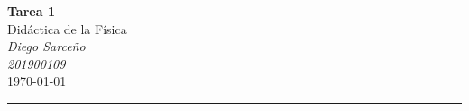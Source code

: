 




%


\textcolor{DS_Black}{
\begin{minipage}{0.85\textwidth}
    \begin{center}
        \textbf{\Large Tarea 1}\\
        \vspace{5pt}
        Didáctica de la Física \\
        \vspace{20pt}
        \textit{Diego Sarceño} \\
        \vspace{5pt}
        \footnotesize{\textit{201900109}} \\
        \vspace{5pt}
        \today
    \end{center}
\end{minipage}
\vspace{10pt}
\hrule
}